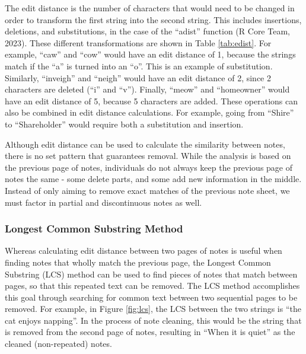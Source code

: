 \documentclass[print]{nuthesis}
\begin{document}
The edit distance is the number of characters that would need to be changed in order to transform the first string into the second string.
This includes insertions, deletions, and substitutions, in the case of the ``adist'' function (R Core Team, 2023).
These different transformations are shown in Table \ref{tab:edist}.
For example, ``caw'' and ``cow'' would have an edit distance of 1, because the strings match if the ``a'' is turned into an ``o''.
This is an example of substitution.
Similarly, ``inveigh'' and ``neigh'' would have an edit distance of 2, since 2 characters are deleted (``i'' and ``v'').
Finally, ``meow'' and ``homeowner'' would have an edit distance of 5, because 5 characters are added.
These operations can also be combined in edit distance calculations.
For example, going from ``Shire'' to ``Shareholder'' would require both a substitution and insertion.

Although edit distance can be used to calculate the similarity between notes, there is no set pattern that guarantees removal.
While the analysis is based on the previous page of notes, individuals do not always keep the previous page of notes the same - some delete parts, and some add new information in the middle.
Instead of only aiming to remove exact matches of the previous note sheet, we must factor in partial and discontinuous notes as well.

\hypertarget{longest-common-substring-method}{%
\subsubsection{Longest Common Substring Method}\label{longest-common-substring-method}}

Whereas calculating edit distance between two pages of notes is useful when finding notes that wholly match the previous page, the Longest Common Substring (LCS) method can be used to find pieces of notes that match between pages, so that this repeated text can be removed.
The LCS method accomplishes this goal through searching for common text between two sequential pages to be removed.
For example, in Figure \ref{fig:lcs}, the LCS between the two strings is ``the cat enjoys napping''.
In the process of note cleaning, this would be the string that is removed from the second page of notes, resulting in ``When it is quiet'' as the cleaned (non-repeated) notes.
\end{document}
